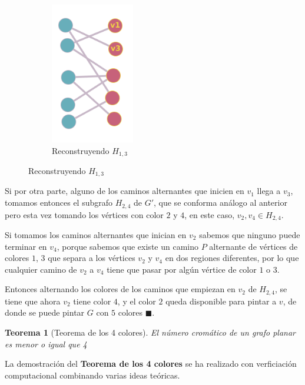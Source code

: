 \documentclass[a4paper,1pt]{report}
\newtheorem*{teo}{Teorema}
\begin{document}
\begin{figure}[H]
    \begin{subfigure}[b]{0.30\textwidth}     
        \centering    
        \includegraphics[width=0.4\textwidth]{figures6/recol4.png}
        \caption{Reconstruyendo $H_{1,3}$}
    \end{subfigure}
\end{figure} 

Si por otra parte, alguno de los caminos alternantes que inicien en $v_1$ llega a $v_3$, tomamos entonces el subgrafo $H_{2,4}$ de $G'$, que se conforma an\'alogo al anterior pero esta vez tomando los v\'ertices con color $2$ y $4$, en este caso, $v_2, v_4 \in H_{2,4}$. 

Si tomamos los caminos alternantes que inician en $v_2$ sabemos que ninguno puede terminar en $v_4$, porque sabemos que existe un camino $P$ alternante de v\'ertices de colores $1$, $3$ que separa a los v\'ertices $v_2$ y $v_4$ en dos regiones diferentes, por lo que cualquier camino de $v_2$ a $v_4$ tiene que pasar por alg\'un v\'ertice de color $1$ o $3$.

Entonces alternando los colores de los caminos que empiezan en $v_2$ de $H_{2,4}$, se tiene que ahora $v_2$ tiene color $4$, y el color $2$ queda disponible para pintar a $v$, de donde se puede pintar $G$ con $5$ colores $\blacksquare$.


\begin{teo}[Teorema de los 4 colores] El número cromático de un grafo planar es menor o igual que 4 
\end{teo}

La demostración del \textbf{Teorema de los 4 colores} se ha realizado con verficiación computacional combinando varias ideas teóricas.
\end{document}
